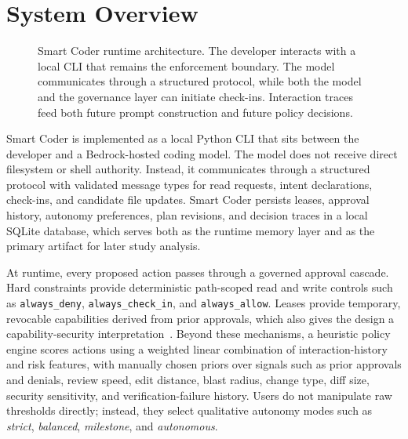 \section{System Overview}

\begin{figure}[t]
  \centering
  \caption{Smart Coder runtime architecture. The developer interacts with a local CLI that remains the enforcement boundary. The model communicates through a structured protocol, while both the model and the governance layer can initiate check-ins. Interaction traces feed both future prompt construction and future policy decisions.}
  \label{fig:architecture}
\end{figure}

Smart Coder is implemented as a local Python CLI that sits between the developer and a Bedrock-hosted coding model. The model does not receive direct filesystem or shell authority. Instead, it communicates through a structured protocol with validated message types for read requests, intent declarations, check-ins, and candidate file updates. Smart Coder persists leases, approval history, autonomy preferences, plan revisions, and decision traces in a local SQLite database, which serves both as the runtime memory layer and as the primary artifact for later study analysis.

At runtime, every proposed action passes through a governed approval cascade. Hard constraints provide deterministic path-scoped read and write controls such as \texttt{always\_deny}, \texttt{always\_check\_in}, and \texttt{always\_allow}. Leases provide temporary, revocable capabilities derived from prior approvals, which also gives the design a capability-security interpretation~\cite{lampson1971protection}. Beyond these mechanisms, a heuristic policy engine scores actions using a weighted linear combination of interaction-history and risk features, with manually chosen priors over signals such as prior approvals and denials, review speed, edit distance, blast radius, change type, diff size, security sensitivity, and verification-failure history. Users do not manipulate raw thresholds directly; instead, they select qualitative autonomy modes such as \emph{strict}, \emph{balanced}, \emph{milestone}, and \emph{autonomous}.


